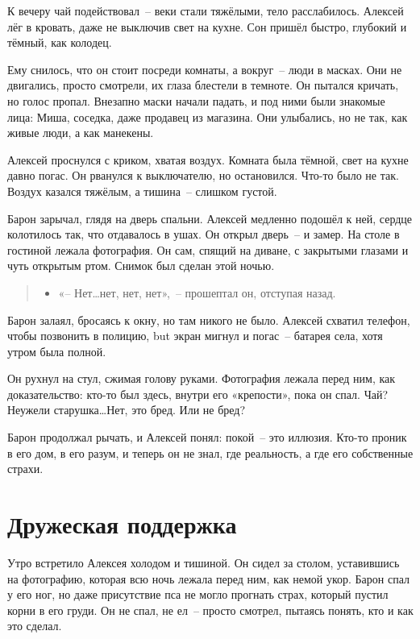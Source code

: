 \documentclass[12pt,a4paper]{book}
\newenvironment{dialogue}{\begin{quote}\itshape\begin{itemize}\item[]}{\end{itemize}\end{quote}}
\begin{document}
К вечеру чай подействовал~-- веки стали тяжёлыми, тело расслабилось. Алексей лёг в кровать, даже не выключив свет на кухне. Сон пришёл быстро, глубокий и тёмный, как колодец.

Ему снилось, что он стоит посреди комнаты, а вокруг~-- люди в масках. Они не двигались, просто смотрели, их глаза блестели в темноте. Он пытался кричать, но голос пропал. Внезапно маски начали падать, и под ними были знакомые лица: Миша, соседка, даже продавец из магазина. Они улыбались, но не так, как живые люди, а как манекены.

Алексей проснулся с криком, хватая воздух. Комната была тёмной, свет на кухне давно погас. Он рванулся к выключателю, но остановился. Что-то было не так. Воздух казался тяжёлым, а тишина~-- слишком густой.

Барон зарычал, глядя на дверь спальни. Алексей медленно подошёл к ней, сердце колотилось так, что отдавалось в ушах. Он открыл дверь~-- и замер. На столе в гостиной лежала фотография. Он сам, спящий на диване, с закрытыми глазами и чуть открытым ртом. Снимок был сделан этой ночью.

\begin{dialogue}
«-- Нет\ldots нет, нет, нет»,~-- прошептал он, отступая назад.
\end{dialogue}

Барон залаял, бросаясь к окну, но там никого не было. Алексей схватил телефон, чтобы позвонить в полицию, but экран мигнул и погас~-- батарея села, хотя утром была полной.

Он рухнул на стул, сжимая голову руками. Фотография лежала перед ним, как доказательство: кто-то был здесь, внутри его «крепости», пока он спал. Чай? Неужели старушка\ldots Нет, это бред. Или не бред?

Барон продолжал рычать, и Алексей понял: покой~-- это иллюзия. Кто-то проник в его дом, в его разум, и теперь он не знал, где реальность, а где его собственные страхи.

\chapter{Дружеская поддержка}

Утро встретило Алексея холодом и тишиной. Он сидел за столом, уставившись на фотографию, которая всю ночь лежала перед ним, как немой укор. Барон спал у его ног, но даже присутствие пса не могло прогнать страх, который пустил корни в его груди. Он не спал, не ел~-- просто смотрел, пытаясь понять, кто и как это сделал.
\end{document}
